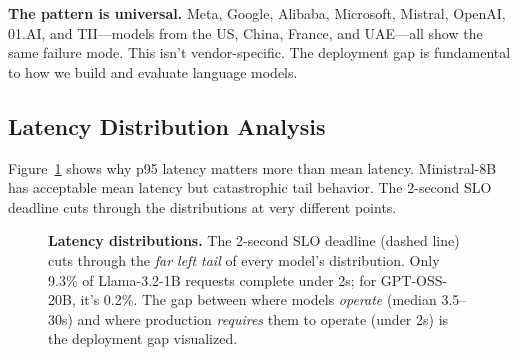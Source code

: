 \documentclass[11pt]{article}
\begin{document}
\textbf{The pattern is universal.} Meta, Google, Alibaba, Microsoft, Mistral, OpenAI, 01.AI, and TII---models from the US, China, France, and UAE---all show the same failure mode. This isn't vendor-specific. The deployment gap is fundamental to how we build and evaluate language models.

\subsection{Latency Distribution Analysis}

Figure~\ref{fig:latency-dist} shows why p95 latency matters more than mean latency.
Ministral-8B has acceptable mean latency but catastrophic tail behavior.
The 2-second SLO deadline cuts through the distributions at very different points.

\begin{figure}[t]
\centering
{}
\caption{\textbf{Latency distributions.} The 2-second SLO deadline (dashed line) cuts through the \emph{far left tail} of every model's distribution. Only 9.3\% of Llama-3.2-1B requests complete under 2s; for GPT-OSS-20B, it's 0.2\%. The gap between where models \emph{operate} (median 3.5--30s) and where production \emph{requires} them to operate (under 2s) is the deployment gap visualized.}
\label{fig:latency-dist}
\end{figure}
\end{document}
